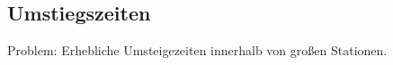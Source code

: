 \begin{image-frame}
\begin{frame}{}
	\vspace{-1em}
	\begin{center}
	\end{center}
\end{frame}
\end{image-frame}


\subsection{Umstiegszeiten}
\begin{frame}
\vspace{8em}
\begin{center}
	\begin{LARGE}
		Problem: Erhebliche Umsteigezeiten innerhalb von großen Stationen.
	\end{LARGE}
\end{center}
\end{frame}


